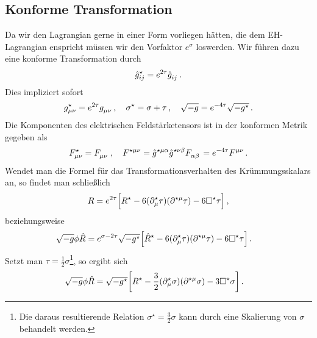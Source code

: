 \subsection{Konforme Transformation}
Da wir den Lagrangian gerne in einer Form vorliegen hätten, die dem
EH-Lagrangian enspricht müssen wir den Vorfaktor $e^{\sigma}$ loswerden. 
Wir führen dazu eine konforme Transformation durch
\begin{equation}
\tensor*{\fived{g}}{*^\star*_i*_j}=e^{2\tau}\tensor{\fived{g}}{_i_j}\,.
\end{equation}
Dies impliziert sofort
\begin{equation}
\tensor*{g}{*^\star*_\mu*_\nu}=e^{2\tau}\tensor{g}{_\mu_\nu}\,,\quad\sigma^\star
=\sigma+\tau\,,\quad \sqrt{-g}=e^{-4\tau}\sqrt{-g^\star}\,.
\end{equation}
Die Komponenten des elektrischen Feldstärketensors ist in der konformen Metrik
gegeben als
\begin{equation}
\tensor*{F}{*^\star_\mu_\nu}=\tensor{F}{_\mu_\nu}\,,\quad\tensor*{F}{*^\star^\mu^\nu}
=\tensor*{\fived{g}}{*^\star*^\mu*^\alpha}\tensor*{\fived{g}}{*^\star*^\nu*^\beta}\tensor{F}{_\alpha_\beta}
=e^{-4\tau}\tensor{F}{^\mu^\nu}\,.
\end{equation}
Wendet man die Formel für das Transformationsverhalten des Krümmungsskalars an,
so findet man schließlich
\begin{equation}
R=e^{2\tau}\left[R^\star-6(\tensor*{\partial}{^\star_\mu}\tau)(\tensor{\partial}{^\star^\mu}\tau)
-6\square^\star\tau\right]\,,
\end{equation}
beziehungsweise
\begin{equation}
\begin{split}
\sqrt{-g}\phi
\fived{R}
&=e^{\sigma-2\tau}\sqrt{-g^\star}\left[\fived{R}^\star
-6(\tensor*{\partial}{^\star_\mu}\tau)(\tensor{\partial}{^\star^\mu}\tau)
-6\square^\star\tau\right]\,.
\end{split}
\end{equation}
Setzt man $\tau = \frac{1}{2}\sigma$\footnote{Die daraus resultierende
Relation $\sigma^\star=\frac{3}{2}\sigma$ kann durch eine Skalierung von
$\sigma$ behandelt werden.}, so ergibt sich
\begin{equation}
\begin{split}
\sqrt{-g}\phi
\fived{R}&=\sqrt{-g^\star}\left[R^\star
-\frac{3}{2}(\tensor*{\partial}{^\star_\mu}\sigma)(\tensor{\partial}{^\star^\mu}\sigma)
-3\square^\star\sigma\right]\,.
\end{split}
\end{equation}

